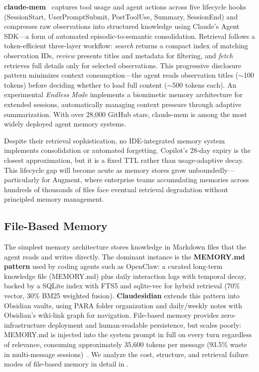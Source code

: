 \textbf{claude-mem}~\cite{newman2025claudemem} captures tool usage and
agent actions across five lifecycle hooks
(SessionStart, UserPromptSubmit, PostToolUse, Summary, SessionEnd) and
compresses raw observations into structured knowledge using Claude's
Agent SDK---a form of automated episodic-to-semantic consolidation.
Retrieval follows a token-efficient three-layer workflow:
\emph{search} returns a compact index of matching observation IDs,
\emph{review} presents titles and metadata for filtering, and
\emph{fetch} retrieves full details only for selected observations.
This progressive disclosure pattern minimizes context consumption---the
agent reads observation titles ($\sim$100 tokens) before deciding
whether to load full content ($\sim$500 tokens each).  An experimental
\emph{Endless Mode} implements a biomimetic memory architecture for
extended sessions, automatically managing context pressure through
adaptive summarization.  With over 28{,}000 GitHub stars, claude-mem is
among the most widely deployed agent memory systems.

Despite their retrieval sophistication, no IDE-integrated memory system
implements consolidation or automated forgetting.  Copilot's 28-day
expiry is the closest approximation, but it is a fixed TTL rather than
usage-adaptive decay.  This lifecycle gap will become acute as memory
stores grow unboundedly---particularly for Augment, where enterprise
teams accumulating memories across hundreds of thousands of files face
eventual retrieval degradation without principled memory management.

\subsection{File-Based Memory}
\label{sec:filebased}

The simplest memory architecture stores knowledge in Markdown files
that the agent reads and writes directly. The dominant instance is the
\textbf{MEMORY.md pattern} used by coding agents such as OpenClaw:
a curated long-term knowledge file (MEMORY.md) plus daily interaction
logs with temporal decay, backed by a SQLite index with FTS5 and
sqlite-vec for hybrid retrieval (70\% vector, 30\% BM25 weighted
fusion). \textbf{Claudesidian} extends this pattern into Obsidian
vaults, using PARA folder organization and daily/weekly notes with
Obsidian's wiki-link graph for navigation. File-based memory provides
zero-infrastructure deployment and human-readable persistence, but
scales poorly: MEMORY.md is injected into the system prompt in full
on every turn regardless of relevance, consuming approximately 35,600
tokens per message (93.5\% waste in multi-message
sessions)~\cite{openclaw9157}. We analyze the cost, structure, and
retrieval failure modes of file-based memory in detail in
.


